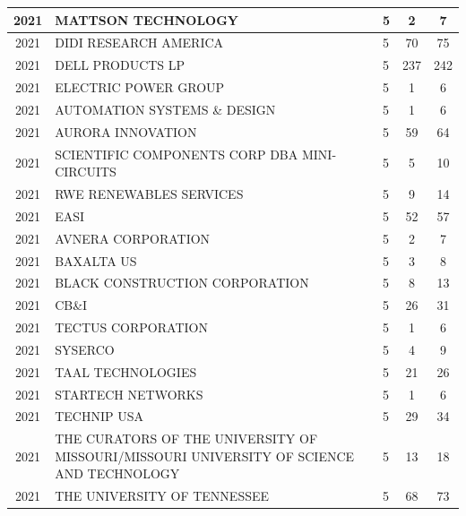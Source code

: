 \documentclass{article}%
\begin{document}
\begin{longtable}{c|p{20em}|p{5em}|c|c}
\hline%
2021&MATTSON TECHNOLOGY&5&2&7\\%
\hline%
2021&DIDI RESEARCH AMERICA&5&70&75\\%
\hline%
2021&DELL PRODUCTS LP&5&237&242\\%
\hline%
2021&ELECTRIC POWER GROUP&5&1&6\\%
\hline%
2021&AUTOMATION SYSTEMS \& DESIGN&5&1&6\\%
\hline%
2021&AURORA INNOVATION&5&59&64\\%
\hline%
2021&SCIENTIFIC COMPONENTS CORP DBA MINI{-}CIRCUITS&5&5&10\\%
\hline%
2021&RWE RENEWABLES SERVICES&5&9&14\\%
\hline%
2021&EASI&5&52&57\\%
\hline%
2021&AVNERA CORPORATION&5&2&7\\%
\hline%
2021&BAXALTA US&5&3&8\\%
\hline%
2021&BLACK CONSTRUCTION CORPORATION&5&8&13\\%
\hline%
2021&CB\&I&5&26&31\\%
\hline%
2021&TECTUS CORPORATION&5&1&6\\%
\hline%
2021&SYSERCO&5&4&9\\%
\hline%
2021&TAAL TECHNOLOGIES&5&21&26\\%
\hline%
2021&STARTECH NETWORKS&5&1&6\\%
\hline%
2021&TECHNIP USA&5&29&34\\%
\hline%
2021&THE CURATORS OF THE UNIVERSITY OF MISSOURI/MISSOURI UNIVERSITY OF SCIENCE AND TECHNOLOGY&5&13&18\\%
\hline%
2021&THE UNIVERSITY OF TENNESSEE&5&68&73\\%
\hline%
\end{longtable}

%
\end{document}
